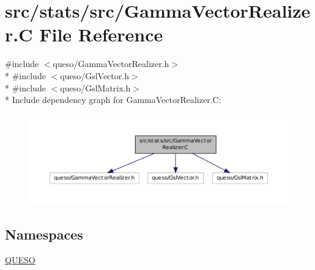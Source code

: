 \hypertarget{_gamma_vector_realizer_8_c}{\section{src/stats/src/\-Gamma\-Vector\-Realizer.C File Reference}
\label{_gamma_vector_realizer_8_c}
}
{\ttfamily \#include $<$queso/\-Gamma\-Vector\-Realizer.\-h$>$}\\*
{\ttfamily \#include $<$queso/\-Gsl\-Vector.\-h$>$}\\*
{\ttfamily \#include $<$queso/\-Gsl\-Matrix.\-h$>$}\\*
Include dependency graph for Gamma\-Vector\-Realizer.\-C\-:
\nopagebreak
\begin{figure}[H]
\begin{center}
\leavevmode
\includegraphics[width=350pt]{_gamma_vector_realizer_8_c__incl}
\end{center}
\end{figure}
\subsection*{Namespaces}
\begin{DoxyCompactItemize}
\item 
\hyperlink{namespace_q_u_e_s_o}{Q\-U\-E\-S\-O}
\end{DoxyCompactItemize}
